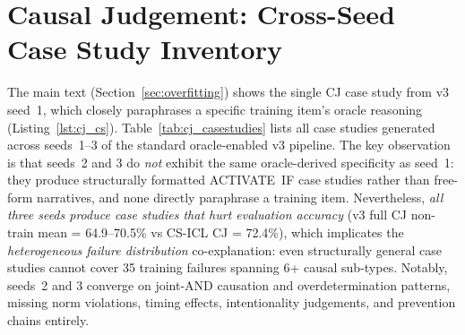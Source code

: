 \documentclass{article}
\begin{document}
\section{Causal Judgement: Cross-Seed Case Study Inventory}
\label{sec:cj_casestudies}

The main text (Section~\ref{sec:overfitting}) shows the single CJ case study from v3 seed~1,
which closely paraphrases a specific training item's oracle reasoning (Listing~\ref{lst:cj_cs}).
Table~\ref{tab:cj_casestudies} lists all case studies generated across seeds~1--3 of the
standard oracle-enabled v3 pipeline.
The key observation is that seeds~2 and 3 do \emph{not} exhibit the same oracle-derived
specificity as seed~1: they produce structurally formatted ACTIVATE~IF case studies rather
than free-form narratives, and none directly paraphrase a training item.
Nevertheless, \emph{all three seeds produce case studies that hurt evaluation accuracy}
(v3 full CJ non-train mean = 64.9--70.5\% vs CS-ICL CJ = 72.4\%), which implicates the
\emph{heterogeneous failure distribution} co-explanation: even structurally general case studies
cannot cover 35 training failures spanning 6+ causal sub-types.
Notably, seeds~2 and 3 converge on joint-AND causation and overdetermination patterns,
missing norm violations, timing effects, intentionality judgements, and prevention chains
entirely.
\end{document}
